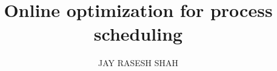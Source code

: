 \documentclass[a4paper,12pt,twoside,openany,HomePaper,chapterbib]{CMU} %
\title{Online optimization for process scheduling}
\author{{JAY RASESH SHAH}}
\numberwithin{equation}{section}
\begin{document}
 


\frontmatter
\tableofcontents

\listoffigures
\begingroup
\let\clearpage\relax
\vspace{3em}
\listoftables
\endgroup

\mainmatter








%
%
\backmatter
\def\nomname{Abbreviations}
\printnomenclature[3cm]
\newpage

\setlength{\bibhang}{7mm}


\end{document}
